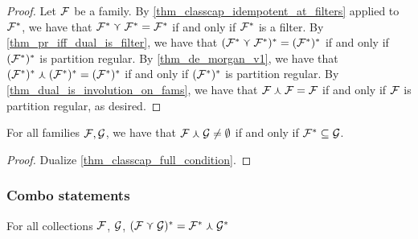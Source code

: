 \begin{proof}
    Let $\mathcal{F}$ be a family.  By \cref{thm_classcap_idempotent_at_filters} applied to $\mathcal{F}^*$, we have that $\mathcal{F}^* \curlyvee \mathcal{F}^* = \mathcal{F}^*$ if and only if $\mathcal{F}^*$ is a filter.  By \cref{thm_pr_iff_dual_is_filter}, we have that $(\mathcal{F}^* \curlyvee \mathcal{F}^*)^* = (\mathcal{F}^*)^*$ if and only if $(\mathcal{F}^*)^*$ is partition regular.  By \cref{thm_de_morgan_v1}, we have that $(\mathcal{F}^*)^* \curlywedge (\mathcal{F}^*)^* = (\mathcal{F}^*)^*$ if and only if $(\mathcal{F}^*)^*$ is partition regular.  By \cref{thm_dual_is_involution_on_fams}, we have that $\mathcal{F} \curlywedge \mathcal{F} = \mathcal{F}$ if and only if $\mathcal{F}$ is partition regular, as desired.
\end{proof}

\begin{theorem}
    \label{thm_classcapdual_empty_condition}
     For all families $\mathcal{F}, \mathcal{G}$, we have that $\mathcal{F} \curlywedge \mathcal{G} \neq \emptyset$ if and only if $\mathcal{F}^* \subseteq \mathcal{G}$.
\end{theorem}

\begin{proof}
     Dualize \cref{thm_classcap_full_condition}.
\end{proof}

\subsubsection{Combo statements}

\begin{theorem}
    \label{thm_de_morgan_v1}
    For all collections $\mathcal{F}$, $\mathcal{G}$, $(\mathcal{F} \curlyvee \mathcal{G})^* = \mathcal{F}^* \curlywedge \mathcal{G}^*$
\end{theorem}

